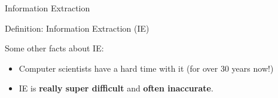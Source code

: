 \documentclass[xcolor=x11names, aspectratio=169,usenames,dvipsnames]{beamer}
\begin{document}
\begin{frame}{Information Extraction}
\begin{block}{Definition: Information Extraction (IE)}
\end{block}\pause\bigskip

\large{Some other facts about IE:}\normalsize
\begin{itemize}[<+->]
\item Computer scientists have a hard time with it (for over \alert{30 years} now!)
\item IE is \textbf{\alert{really super difficult}} and \alert{\textbf{often inaccurate}}.
\end{itemize}
\end{frame}


\end{document}
